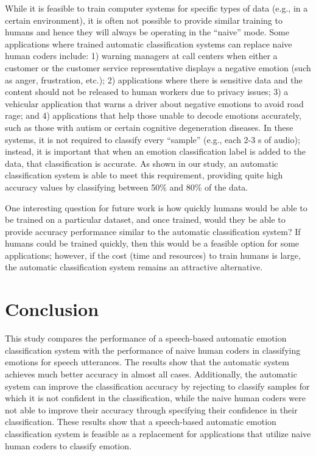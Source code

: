 \documentclass{article}
\begin{document}
While it is feasible to train computer systems for specific types of data (e.g., in a certain environment), it is often not possible to provide similar training to humans and hence they will always be operating in the ``naive'' mode.  Some applications where trained automatic classification systems can replace naive human coders include: 1) warning managers at call centers when either a customer or the customer service representative displays a negative emotion (such as anger, frustration, etc.); 2) applications where there is sensitive data and the content should not be released to human workers due to privacy issues; 3) a vehicular application that warns a driver about negative emotions to avoid road rage; and 4) applications that help those unable to decode emotions accurately, such as those with autism or certain cognitive degeneration diseases.  In these systems, it is not required to classify every ``sample'' (e.g., each 2-3 s of audio); instead, it is important that when an emotion classification label is added to the data, that classification is accurate.  As shown in our study, an automatic classification system is able to meet this requirement, providing quite high accuracy values by classifying between 50\% and 80\% of the data. \par
One interesting question for future work is how quickly humans would be able to be trained on a particular dataset, and once trained, would they be able to provide accuracy performance similar to the automatic classification system?  If humans could be trained quickly, then this would be a feasible option for some applications; however, if the cost (time and resources) to train humans is large, the automatic classification system remains an attractive alternative.
\newpage
\section{Conclusion}
This study compares the performance of a speech-based automatic emotion classification system with the performance of naive human coders in classifying emotions for speech utterances. The results show that the automatic system achieves much better accuracy in almost all cases.  Additionally, the automatic system can improve the classification accuracy by rejecting to classify samples for which it is not confident in the classification, while the naive human coders were not able to improve their accuracy through specifying their confidence in their classification.  These results show that a speech-based automatic emotion classification system is feasible as a replacement for applications that utilize naive human coders to classify emotion.
\balance

	
		
		
		
\end{document}
